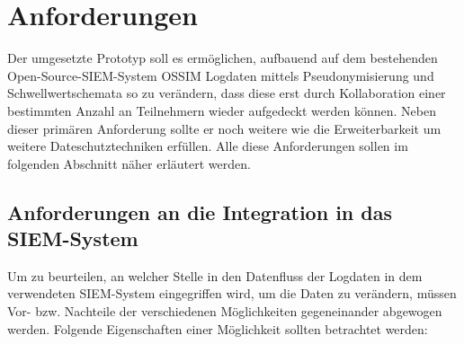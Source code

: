 \section{Anforderungen}

\label{sec_impl_requirements}

Der umgesetzte Prototyp soll es ermöglichen, aufbauend auf dem bestehenden Open-Source-SIEM-System OSSIM Logdaten mittels Pseudonymisierung und Schwellwertschemata so zu verändern, dass diese erst durch Kollaboration einer bestimmten Anzahl an Teilnehmern wieder aufgedeckt werden können. Neben dieser primären Anforderung sollte er noch weitere wie die Erweiterbarkeit um weitere Dateschutztechniken erfüllen. Alle diese Anforderungen sollen im folgenden Abschnitt näher erläutert werden. 

\subsection{Anforderungen an die Integration in das SIEM-System}

\label{subsec_impl_requirements_ossimintegration}


Um zu beurteilen, an welcher Stelle in den Datenfluss der Logdaten in dem verwendeten SIEM-System  eingegriffen wird, um die Daten zu verändern, müssen Vor- bzw. Nachteile der verschiedenen Möglichkeiten gegeneinander abgewogen werden. Folgende Eigenschaften einer Möglichkeit sollten betrachtet werden:

